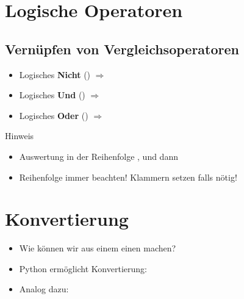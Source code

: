 \livecoding

\section{Logische Operatoren}
\subsection{Vernüpfen von Vergleichsoperatoren}
\begin{frame}
    \slidehead
    \pause
    \begin{itemize}[<+->]
        \item Logisches \textbf{Nicht} ()  $\Rightarrow$ 
        \item Logisches \textbf{Und} () $\Rightarrow$ 
        \item Logisches \textbf{Oder} ()  $\Rightarrow$ 
    \end{itemize}
    \pause
    \pause
    \begin{block}{Hinweis}
        \begin{itemize}[<+->]
            \item Auswertung in der Reihenfolge ,  und dann 
            \item Reihenfolge immer beachten!
                Klammern setzen falls nötig!
        \end{itemize}
    \end{block}
\end{frame}

\livecoding

\section{Konvertierung}
\begin{frame}
    \slidehead
    \begin{itemize}[<+->]
        \item Wie können wir aus einem  einen  machen?
        \item Python ermöglicht Konvertierung: 
        \item Analog dazu: 
    \end{itemize}
\end{frame}

